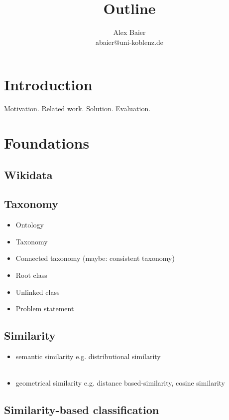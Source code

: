 \documentclass{scrartcl} %
\title{Outline}
\author{Alex Baier \\ abaier@uni-koblenz.de}
\begin{document}
\maketitle

\section{Introduction}
Motivation. Related work. Solution. Evaluation.

\section{Foundations}

\subsection{Wikidata}

\subsection{Taxonomy}
\begin{itemize}
\item Ontology\\
	\citeauthor{Cimiano2009} \cite{Cimiano2009}
\item Taxonomy\\
	\citeauthor{Cimiano2009} \cite{Cimiano2009}
\item Connected taxonomy (maybe: consistent taxonomy)
\item Root class
\item Unlinked class
\item Problem statement
\end{itemize}

\subsection{Similarity}
\begin{itemize}
\item semantic similarity e.g. distributional similarity \\
	\citeauthor{Lin1998} \cite{Lin1998} \\
	\citeauthor{Rodriguez2003} \cite{Rodriguez2003}
\item geometrical similarity e.g. distance based-similarity, cosine similarity
\end{itemize}

\subsection{Similarity-based classification}
\citeauthor{Chen2009} \cite{Chen2009}\\
\citeauthor{Zhang2015} \cite{Zhang2015}
\end{document}
